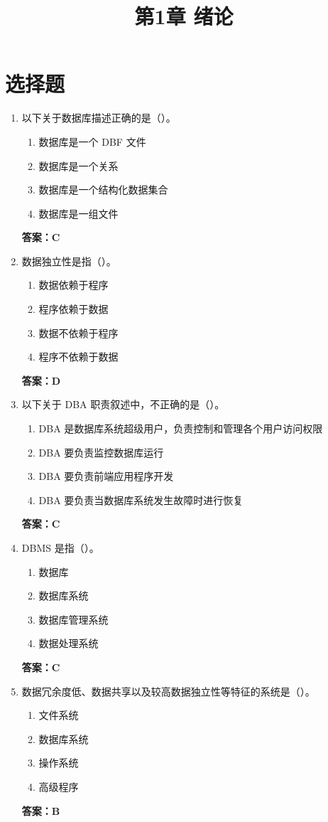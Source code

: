 \documentclass[12pt, a4paper]{article}
\title{\textbf{第1章 绪论}}
\date{}
\begin{document}
\section{选择题}

\begin{enumerate}[label=\arabic*.]
	\item 以下关于数据库描述正确的是（\quad）。
	      \begin{enumerate}
		      \item 数据库是一个 DBF 文件
		      \item 数据库是一个关系
		      \item 数据库是一个结构化数据集合
		      \item 数据库是一组文件
	      \end{enumerate}
	      \textbf{答案：C}

	\item 数据独立性是指（\quad）。
	      \begin{enumerate}
		      \item 数据依赖于程序
		      \item 程序依赖于数据
		      \item 数据不依赖于程序
		      \item 程序不依赖于数据
	      \end{enumerate}
	      \textbf{答案：D}

	\item 以下关于 DBA 职责叙述中，不正确的是（\quad）。
	      \begin{enumerate}
		      \item DBA 是数据库系统超级用户，负责控制和管理各个用户访问权限
		      \item DBA 要负责监控数据库运行
		      \item DBA 要负责前端应用程序开发
		      \item DBA 要负责当数据库系统发生故障时进行恢复
	      \end{enumerate}
	      \textbf{答案：C}

	\item DBMS 是指（\quad）。
	      \begin{enumerate}
		      \item 数据库
		      \item 数据库系统
		      \item 数据库管理系统
		      \item 数据处理系统
	      \end{enumerate}
	      \textbf{答案：C}

	\item 数据冗余度低、数据共享以及较高数据独立性等特征的系统是（\quad）。
	      \begin{enumerate}
		      \item 文件系统
		      \item 数据库系统
		      \item 操作系统
		      \item 高级程序
	      \end{enumerate}
	      \textbf{答案：B}


\end{enumerate}
\end{document}
